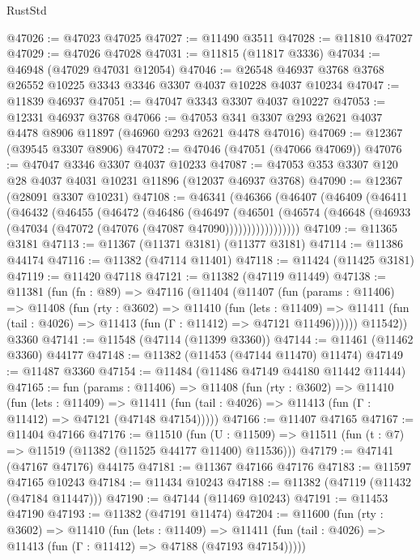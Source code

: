\begin{lexlean}{RustStd}
\begin{coremodule}
@47026 := @47023 @47025
@47027 := @11490 @3511
@47028 := @11810 @47027
@47029 := @47026 @47028
@47031 := @11815 (@11817 @3336)
@47034 := @46948 (@47029 @47031 @12054)
@47046 := @26548 @46937 @3768 @3768 @26552 @10225 @3343 @3346 @3307 @4037 @10228 @4037 @10234
@47047 := @11839 @46937
@47051 := @47047 @3343 @3307 @4037 @10227
@47053 := @12331 @46937 @3768
@47066 := @47053 @341 @3307 @293 @2621 @4037 @4478 @8906 @11897 (@46960 @293 @2621 @4478 @47016)
@47069 := @12367 (@39545 @3307 @8906)
@47072 := @47046 (@47051 (@47066 @47069))
@47076 := @47047 @3346 @3307 @4037 @10233
@47087 := @47053 @353 @3307 @120 @28 @4037 @4031 @10231 @11896 (@12037 @46937 @3768)
@47090 := @12367 (@28091 @3307 @10231)
@47108 := @46341
    (@46366
      (@46407
        (@46409
          (@46411
            (@46432
              (@46455
                (@46472
                  (@46486
                    (@46497
                      (@46501
                        (@46574
                          (@46648 (@46933 (@47034 (@47072 (@47076 (@47087 @47090)))))))))))))))))
@47109 := @11365 @3181
@47113 := @11367 (@11371 @3181) (@11377 @3181)
@47114 := @11386 @44174
@47116 := @11382 (@47114 @11401)
@47118 := @11424 (@11425 @3181)
@47119 := @11420 @47118
@47121 := @11382 (@47119 @11449)
@47138 := @11381
    (fun (fn : @89) =>
    @47116
      (@11404
        (@11407
          (fun (params : @11406) =>
          @11408
            (fun (rty : @3602) =>
            @11410
              (fun (lets : @11409) =>
              @11411 (fun (tail : @4026) => @11413 (fun (Γ : @11412) => @47121 @11496))))))
        @11542))
    @3360
@47141 := @11548 (@47114 (@11399 @3360))
@47144 := @11461 (@11462 @3360) @44177
@47148 := @11382 (@11453 (@47144 @11470) @11474)
@47149 := @11487 @3360
@47154 := @11484 (@11486 @47149 @44180 @11442 @11444)
@47165 := fun (params : @11406) =>
  @11408
    (fun (rty : @3602) =>
    @11410
      (fun (lets : @11409) =>
      @11411 (fun (tail : @4026) => @11413 (fun (Γ : @11412) => @47121 (@47148 @47154)))))
@47166 := @11407 @47165
@47167 := @11404 @47166
@47176 := @11510
    (fun (U : @11509) => @11511 (fun (t : @7) => @11519 (@11382 (@11525 @44177 @11400) @11536)))
@47179 := @47141 (@47167 @47176) @44175
@47181 := @11367 @47166 @47176
@47183 := @11597 @47165 @10243
@47184 := @11434 @10243
@47188 := @11382 (@47119 (@11432 (@47184 @11447)))
@47190 := @47144 (@11469 @10243)
@47191 := @11453 @47190
@47193 := @11382 (@47191 @11474)
@47204 := @11600
    (fun (rty : @3602) =>
    @11410
      (fun (lets : @11409) =>
      @11411 (fun (tail : @4026) => @11413 (fun (Γ : @11412) => @47188 (@47193 @47154)))))

\end{coremodule}
\end{lexlean}
